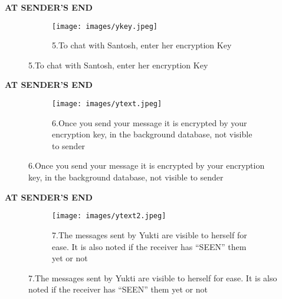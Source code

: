 \documentclass{beamer}
\begin{document}
\begin{frame}
\begin{tcolorbox}
\begin{center}
\textsc{\textbf{\textcolor{byzantium}{AT SENDER'S END}}}
\end{center}
\end{tcolorbox}
\begin{figure}
\centering
\begin{subfigure}{\textwidth}
  \centering
  \texttt{[image: images/ykey.jpeg]}
  \caption{5.To chat with Santosh, enter her encryption Key  }
  \label{fig:sub1}
\end{subfigure}
\end{figure}
\end{frame}

\begin{frame}
\begin{tcolorbox}
\begin{center}
\textsc{\textbf{\textcolor{byzantium}{AT SENDER'S END}}}
\end{center}
\end{tcolorbox}
\begin{figure}
\centering
\begin{subfigure}{\textwidth}
  \centering
  \texttt{[image: images/ytext.jpeg]}
  \caption{6.Once you send your message it is encrypted by your encryption key, in the background database, not visible to sender}
  \label{fig:sub1}
\end{subfigure}
\end{figure}
\end{frame}


\begin{frame}
\begin{tcolorbox}
\begin{center}
\textsc{\textbf{\textcolor{byzantium}{AT SENDER'S END}}}
\end{center}
\end{tcolorbox}
\begin{figure}
\centering
\begin{subfigure}{\textwidth}
  \centering
  \texttt{[image: images/ytext2.jpeg]}
  \caption{7.The messages sent by Yukti are visible to herself for ease. It is also noted if the receiver has “SEEN” them yet or not}
  \label{fig:sub1}
\end{subfigure}
\end{figure}
\end{frame}
\end{document}
